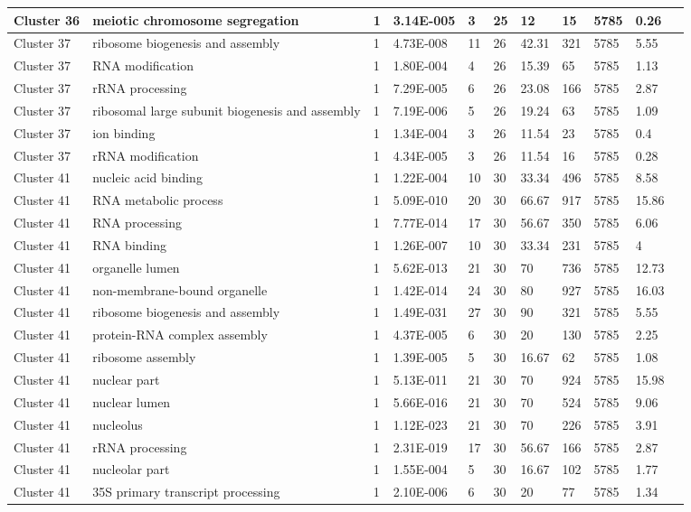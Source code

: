 \begin{tabular}{|l|l|l|l|l|l|l|l|l|l|l|}
\hline
Cluster 36&meiotic chromosome segregation&1&3.14E-005&3&25&12&15&5785&0.26&\\
\hline
Cluster 37&ribosome biogenesis and assembly&1&4.73E-008&11&26&42.31&321&5785&5.55&\\
\hline
Cluster 37&RNA modification&1&1.80E-004&4&26&15.39&65&5785&1.13&\\
\hline
Cluster 37&rRNA processing&1&7.29E-005&6&26&23.08&166&5785&2.87&\\
\hline
Cluster 37&ribosomal large subunit biogenesis and assembly&1&7.19E-006&5&26&19.24&63&5785&1.09&\\
\hline
Cluster 37&ion binding&1&1.34E-004&3&26&11.54&23&5785&0.4&\\
\hline
Cluster 37&rRNA modification&1&4.34E-005&3&26&11.54&16&5785&0.28&\\
\hline
Cluster 41&nucleic acid binding&1&1.22E-004&10&30&33.34&496&5785&8.58&\\
\hline
Cluster 41&RNA metabolic process&1&5.09E-010&20&30&66.67&917&5785&15.86&\\
\hline
Cluster 41&RNA processing&1&7.77E-014&17&30&56.67&350&5785&6.06&\\
\hline
Cluster 41&RNA binding&1&1.26E-007&10&30&33.34&231&5785&4&\\
\hline
Cluster 41&organelle lumen&1&5.62E-013&21&30&70&736&5785&12.73&\\
\hline
Cluster 41&non-membrane-bound organelle&1&1.42E-014&24&30&80&927&5785&16.03&\\
\hline
Cluster 41&ribosome biogenesis and assembly&1&1.49E-031&27&30&90&321&5785&5.55&\\
\hline
Cluster 41&protein-RNA complex assembly&1&4.37E-005&6&30&20&130&5785&2.25&\\
\hline
Cluster 41&ribosome assembly&1&1.39E-005&5&30&16.67&62&5785&1.08&\\
\hline
Cluster 41&nuclear part&1&5.13E-011&21&30&70&924&5785&15.98&\\
\hline
Cluster 41&nuclear lumen&1&5.66E-016&21&30&70&524&5785&9.06&\\
\hline
Cluster 41&nucleolus&1&1.12E-023&21&30&70&226&5785&3.91&\\
\hline
Cluster 41&rRNA processing&1&2.31E-019&17&30&56.67&166&5785&2.87&\\
\hline
Cluster 41&nucleolar part&1&1.55E-004&5&30&16.67&102&5785&1.77&\\
\hline
Cluster 41&35S primary transcript processing&1&2.10E-006&6&30&20&77&5785&1.34&\\

\end{tabular}
